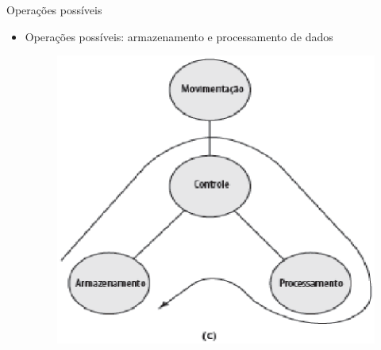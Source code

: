 \begin{slide}[toc=]{Operações possíveis}
    \begin{itemize}
       \item Operações possíveis: armazenamento e processamento de dados
       \begin{figure}[h]
      \centering
      \includegraphics[height = 0.55\textheight]{figs/f1-2d.eps}
    \end{figure}
    \end{itemize}
 \end{slide}

